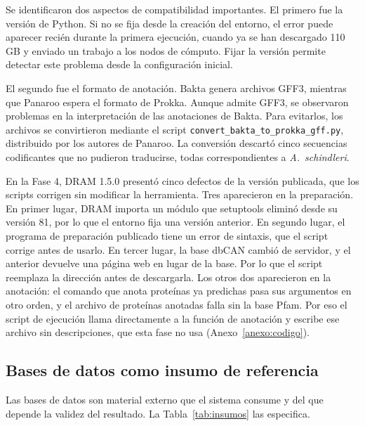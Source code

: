Se identificaron dos aspectos de compatibilidad importantes. El primero fue 
la versión de Python. Si no se fija desde la creación del entorno, el error puede
aparecer recién durante la primera ejecución, cuando ya se han descargado 110 GB 
y enviado un trabajo a los nodos de cómputo. Fijar la versión permite detectar este problema desde 
la configuración inicial.

El segundo fue el formato de anotación. Bakta genera archivos GFF3, mientras 
que Panaroo espera el formato de Prokka. Aunque admite GFF3, se observaron problemas en
la interpretación de las anotaciones de Bakta. Para evitarlos, los archivos se convirtieron 
mediante el script \texttt{convert\_bakta\_to\_prokka\_gff.py},
distribuido por los autores de Panaroo. La conversión descartó cinco secuencias
codificantes que no pudieron traducirse, todas correspondientes a \textit{A.~schindleri}.

\begin{nuevo}
En la Fase 4, DRAM 1.5.0 presentó cinco defectos de la versión publicada, que
los scripts corrigen sin modificar la herramienta. Tres aparecieron en la
preparación. En primer lugar, DRAM importa un módulo que setuptools eliminó
desde su versión 81, por lo que el entorno fija una versión anterior. En
segundo lugar, el programa de preparación publicado tiene un error de sintaxis,
que el script corrige antes de usarlo. En tercer lugar, la base dbCAN cambió de
servidor, y el anterior devuelve una página web en lugar de la base. Por lo que
el script reemplaza la dirección antes de descargarla. Los otros dos
aparecieron en la anotación: el comando que anota proteínas ya predichas pasa
sus argumentos en otro orden, y el archivo de proteínas anotadas falla sin la
base Pfam. Por eso el script de ejecución llama directamente a la función de
anotación y escribe ese archivo sin descripciones, que esta fase no usa
(Anexo~\ref{anexo:codigo}).
\end{nuevo}

\subsection{Bases de datos como insumo de referencia}

Las bases de datos son material externo que el sistema consume y del que
depende la validez del resultado. La Tabla~\ref{tab:insumos} las especifica.


